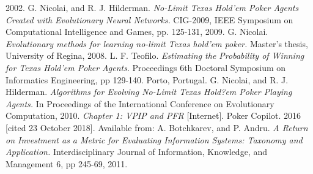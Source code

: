\begin{thebibliography}{9}
  2002.
G. Nicolai, and R. J. Hilderman.
\textit{No-Limit Texas Hold'em Poker Agents Created with Evolutionary Neural Networks.}
CIG-2009, IEEE Symposium on Computational Intelligence and Games, pp. 125-131, 2009.
G. Nicolai.
\textit{Evolutionary methods for learning no-limit Texas hold'em poker.} Master's thesis, University of Regina, 2008.
L. F. Teofilo.
\textit{Estimating the Probability of Winning for Texas Hold'em Poker Agents}.
Proceedings 6th Doctoral Symposium on Informatics Engineering, pp 129-140. Porto, Portugal.
G. Nicolai, and R. J. Hilderman.
\textit{Algorithms for Evolving No-Limit Texas Hold?em Poker Playing Agents.}
In Proceedings of the International Conference on Evolutionary Computation, 2010.
\textit{Chapter 1: VPIP and PFR} [Internet]. Poker Copilot. 2016 [cited 23 October 2018]. Available from: \href{https://pokercopilot.com/poker-statistics/vpip-pfr}{} 
A. Botchkarev, and P. Andru.
\textit{A Return on Investment as a Metric for Evaluating Information Systems: Taxonomy and Application.}  Interdisciplinary Journal of Information, Knowledge, and Management 6, pp 245-69, 2011.
\end{thebibliography}

